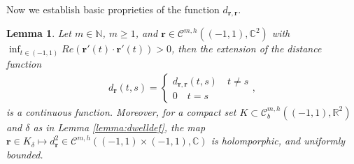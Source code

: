 \documentclass{article}
\newtheorem{lemma}[theorem]{Lemma}
\newcommand{\IC}{{\mathbb C}}
\newcommand{\IN}{{\mathbb N}}
\newcommand{\IR}{{\mathbb R}}
\newcommand{\cmspaceh}[4]{\mathcal{C}^{#1,#2} \left( #3, #4 \right)}
\newcommand{\rgeoh}[2]{\mathcal{C}_b^{#1,#2}\left( (-1,1), \IR^2 \right)}
\newcommand{\cgeoh}[1]{\mathcal{C}^{#1,h}\left( (-1,1), \IC^2 \right)}
\newcommand{\br}{\bm{r}}
\begin{document}
Now we establish basic proprieties of the function $d_{\br,\br}$. 

\begin{lemma}
\label{lemma:dself}
Let $m \in \IN$, $m\geq 1$, and $\br \in  \cgeoh{m}$ with $\inf_{t \in (-1,1)}Re(\br'(t) \cdot \br'(t)) >0$, then the extension of the distance function 
\begin{align*}
d_{\br} (t,s) = \begin{cases} d_{\br,\br}(t,s) \quad t\neq s \\ 
0 \quad t=s \end{cases},
\end{align*} 
is a continuous function. Moreover, for a compact set $K \subset \rgeoh{m}{h}$ and $\delta$ as in Lemma \ref{lemma:dwelldef}, the map $\br \in K_\delta \mapsto d_{\br}^2 \in \cmspaceh{m}{h}{(-1,1)\times(-1,1)}{\IC}$ is holomporphic, and uniformly bounded.   
\end{lemma}
\end{document}
